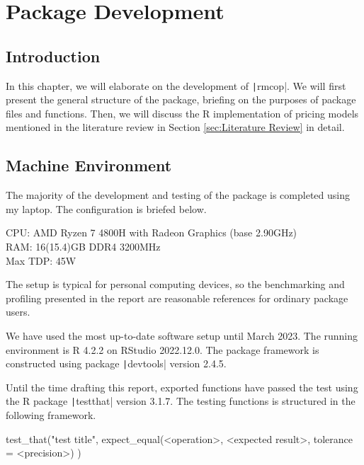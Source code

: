 \chapter{Package Development} \label{cpt:Pkg Dev}

\section{Introduction}

In this chapter, we will elaborate on the development of \texttt|rmcop|. We will first present the general structure of the package, briefing on the purposes of package files and functions. Then, we will discuss the R implementation of pricing models mentioned in the literature review in Section \ref{sec:Literature Review} in detail.

\section{Machine Environment} \label{sec:machine_env}

The majority of the development and testing of the package is completed using my laptop. The configuration is briefed below.

\begin{listing}[H]
CPU: AMD Ryzen 7 4800H with Radeon Graphics (base 2.90GHz) \\
RAM: 16(15.4)GB DDR4 3200MHz \\
Max TDP: 45W
\end{listing}

The setup is typical for personal computing devices, so the benchmarking and profiling presented in the report are reasonable references for ordinary package users.

We have used the most up-to-date software setup until March 2023. The running environment is R 4.2.2 on RStudio 2022.12.0. The package framework is constructed using package \texttt|devtools| \cite{Wickham2022} version 2.4.5.

Until the time drafting this report, exported functions have passed the test using the R package \texttt|testthat| \cite{Wickham2023} version 3.1.7. The testing functions is structured in the following framework.

\begin{Rminted}
test_that("test title", {
    expect_equal(<operation>,
                 <expected result>,
                 tolerance = <precision>)
})
\end{Rminted}

